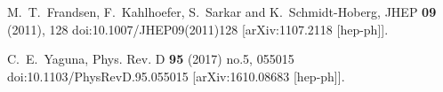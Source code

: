 \begin{thebibliography}{99}
M.~T.~Frandsen, F.~Kahlhoefer, S.~Sarkar and K.~Schmidt-Hoberg,
JHEP \textbf{09} (2011), 128
doi:10.1007/JHEP09(2011)128
[arXiv:1107.2118 [hep-ph]].

C.~E.~Yaguna,
Phys. Rev. D \textbf{95} (2017) no.5, 055015
doi:10.1103/PhysRevD.95.055015
[arXiv:1610.08683 [hep-ph]].

\end{thebibliography}
